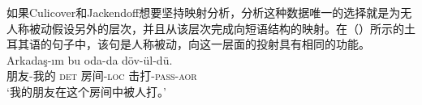 \begin{exe}
\begin{xlist}[iv.]
\begin{exe}
\begin{xlist}[iv.]

如果Culicover和Jackendoff想要坚持映射分析，分析这种数据唯一的选择就是为无人称被动假设另外的层次，并且从该层次完成向短语结构的映射。在（）所示的土耳其语的句子中，该句是人称被动，向这一层面的投射具有相同的功能。
\ea
\gll Arkadaş-ım bu oda-da döv-ül-dü.\\
     朋友-我的  \textsc{det}   房间-\textsc{loc} 击打-\textsc{pass}-\textsc{aor}\\
\glt `我的朋友在这个房间中被人打。'%
\z


\end{xlist}
\end{exe}
\end{xlist}
\end{exe}
